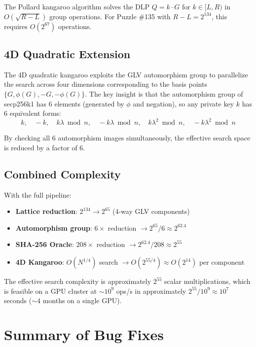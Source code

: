 \documentclass[11pt,a4paper]{article}
\theoremstyle{definition}
\begin{document}
The Pollard kangaroo algorithm solves the DLP $Q = k \cdot G$ for $k \in [L, R)$ in $O(\sqrt{R-L})$ group operations. For Puzzle \#135 with $R - L = 2^{134}$, this requires $O(2^{67})$ operations.

\subsection{4D Quadratic Extension}

The 4D quadratic kangaroo exploits the GLV automorphism group to parallelize the search across four dimensions corresponding to the basis points $\{G, \phi(G), -G, -\phi(G)\}$. The key insight is that the automorphism group of secp256k1 has 6 elements (generated by $\phi$ and negation), so any private key $k$ has 6 equivalent forms:
$$k, \quad -k, \quad k\lambda \bmod n, \quad -k\lambda \bmod n, \quad k\lambda^2 \bmod n, \quad -k\lambda^2 \bmod n$$

By checking all 6 automorphism images simultaneously, the effective search space is reduced by a factor of 6.

\subsection{Combined Complexity}

With the full pipeline:
\begin{itemize}[leftmargin=2em]
    \item \textbf{Lattice reduction}: $2^{134} \to 2^{65}$ (4-way GLV components)
    \item \textbf{Automorphism group}: $6\times$ reduction $\to 2^{65}/6 \approx 2^{62.4}$
    \item \textbf{SHA-256 Oracle}: $208\times$ reduction $\to 2^{62.4}/208 \approx 2^{55}$
    \item \textbf{4D Kangaroo}: $O(N^{1/4})$ search $\to O(2^{55/4}) \approx O(2^{14})$ per component
\end{itemize}

The effective search complexity is approximately $2^{55}$ scalar multiplications, which is feasible on a GPU cluster at $\sim 10^9$ ops/s in approximately $2^{55}/10^9 \approx 10^7$ seconds ($\sim 4$ months on a single GPU).

\section{Summary of Bug Fixes}
\end{document}
